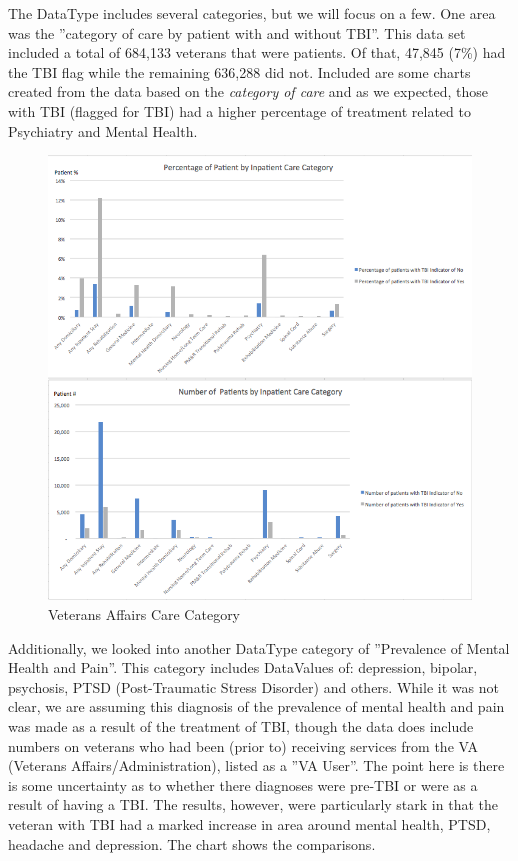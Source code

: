 \documentclass[sigconf]{acmart}
\begin{document}
The DataType includes several categories, but we will focus on a few.  One area was the ''category of care by patient with and without TBI''.  This data set included a total of 684,133 veterans that were patients.  Of that, 47,845 (7\%) had the TBI flag while the remaining 636,288 did not.  Included are some charts created from the data based on the {\em category of care} and as we expected, those with TBI (flagged for TBI) had a higher percentage of treatment related to Psychiatry and Mental Health.  

\begin{figure}[h]
\includegraphics[width=\columnwidth]{images/graph5.png}
\caption{Veterans Affairs Care Category}\label{f:Veterans Affairs Care Category}
\end{figure}

Additionally, we looked into another DataType category of  ''Prevalence of Mental Health and Pain''.  This category includes DataValues of: depression, bipolar, psychosis, PTSD (Post-Traumatic Stress Disorder) and others.  While it was not clear, we are assuming this diagnosis of the prevalence of mental health and pain was made as a result of the treatment of TBI, though the data does include numbers on veterans who had been (prior to) receiving services from the VA (Veterans Affairs/Administration), listed as a ''VA User''.  The point here is there is some uncertainty as to whether there diagnoses were pre-TBI or were as a result of having a TBI.  The results, however, were particularly stark in that the veteran with TBI had a marked increase in area around mental health, PTSD, headache and depression.   The chart shows the comparisons.
\end{document}
